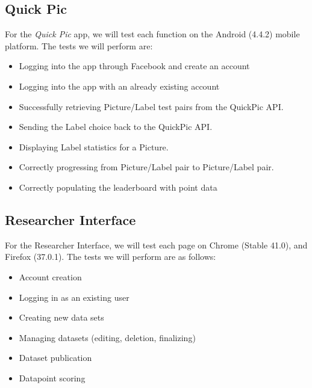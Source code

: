 \documentclass{article}
\begin{document}
\subsection{Quick Pic}
For the \textit{Quick Pic} app, we will test each function on the Android
(4.4.2) mobile platform.  The tests we will perform are:
\begin{itemize}

  \item Logging into the app through Facebook and create an account

  \item Logging into the app with an already existing account

  \item Successfully retrieving Picture/Label test pairs from the QuickPic API.

  \item Sending the Label choice back to the QuickPic API.

  \item Displaying Label statistics for a Picture.

  \item Correctly progressing from Picture/Label pair to Picture/Label pair.

  \item Correctly populating the leaderboard with point data

\end{itemize}

\subsection{Researcher Interface}

For the Researcher Interface, we will test each page on Chrome (Stable 41.0), and Firefox (37.0.1). The tests we will perform are as follows:

\begin{itemize}
\item Account creation
\item Logging in as an existing user
\item Creating new data sets
\item Managing datasets (editing, deletion, finalizing)
\item Dataset publication
\item Datapoint scoring
\end{itemize}
\end{document}
